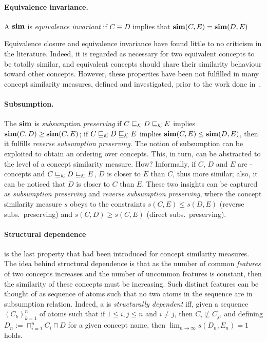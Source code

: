 \paragraph{Equivalence invariance.}
A \csm \(\operatorname{\mathbf{sim}}\) is \emph{equivalence invariant} if \(C \equiv D\) implies that \(\operatorname{\mathbf{sim}}(C,E) = \operatorname{\mathbf{sim}}(D,E)\)

Equivalence closure and equivalence invariance have found little to no criticism in the literature.
Indeed, it is regarded as necessary for two equivalent concepts to be totally similar, and equivalent concepts should share their similarity behaviour toward other concepts.
However, these properties have been not fulfilled in many concept similarity measures, defined and investigated, prior to the work done in~\cite{LeTu12}.

  \paragraph{Subsumption.}
  The \csm \(\operatorname{\mathbf{sim}}\) is \emph{subsumption preserving} if \(C \sqsubseteq_{\mathcal{K}} D \sqsubseteq_{\mathcal{K}} E\) implies \(\operatorname{\mathbf{sim}}(C,D)  \ge \operatorname{\mathbf{sim}}(C,E)\); if \(C \sqsubseteq_{\mathcal{K}} D \sqsubseteq_{\mathcal{K}} E\) implies \(\operatorname{\mathbf{sim}}(C,E) \le \operatorname{\mathbf{sim}}(D,E)\), then it fulfills \emph{reverse subsumption preserving}.
  The notion of subsumption can be exploited to obtain an ordering over concepts.
  This, in turn, can be abstracted to the level of a concept similarity measure. How?
  Informally, if \(C\), \(D\) and \(E\) are \elh-concepts and \(C \sqsubseteq_{\mathcal{K}} D \sqsubseteq_{\mathcal{K}} E\), \(D\) is closer to \(E\) than \(C\), thus more similar;
  also, it can be noticed that \(D\) is closer to \(C\) than \(E\).
  These two insights can be captured as \emph{subsumption preserving} and \emph{reverse subsumption preserving}, where the concept similarity measure \(s\) obeys to the constraints \(s(C,E) \le s(D,E)\) (reverse subs.\ preserving) and \(s(C,D) \ge s(C,E)\) (direct subs.\ preserving).

  \paragraph{Structural dependence} is the last property that had been introduced for concept similarity measures.
  The idea behind structural dependence is that as the number of common \emph{features} of two concepts increases and the number of uncommon features is constant, then the similarity of these concepts must be increasing.
  Such distinct features can be thought of as sequence of atoms such that no two atoms in the sequence are in subsumption relation.
  Indeed, a \csm is \emph{structurally dependent} iff, given a sequence \({(C_k)}_{k=1}^n\) of atoms such that if \(1 \le i,j \le n\) and \(i \ne j\), then \(C_i \not\sqsubseteq C_j\), and defining \(D_n := \sqcap_{i=1}^n C_i \sqcap D\) for a given concept name, then \(\lim_{n \to \infty}s(D_n,E_n) = 1\) holds.
